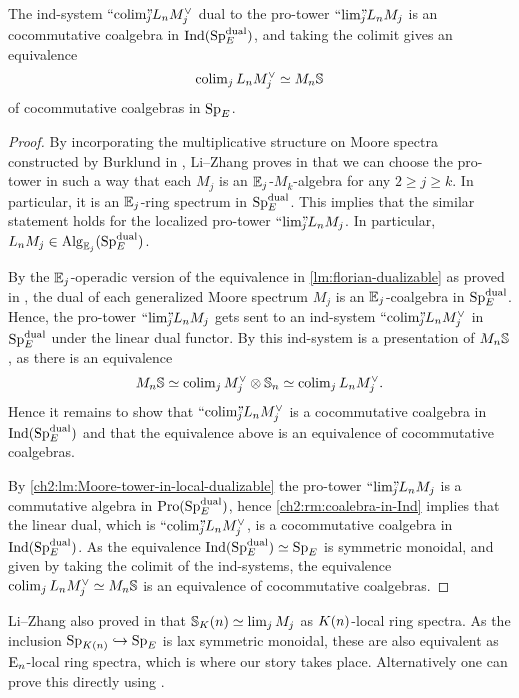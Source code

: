 \begin{lemma}
    \label{ch2:lm:coalgebra-ind-presentation-of-monochromatic-sphere}
    The ind-system $\indcolim L_n M_j^\vee$ dual to the pro-tower $\prolim L_n M_j$ is an cocommutative coalgebra in $\Ind(\SpE\dual)$, and taking the colimit gives an equivalence 
    \[\colim_j L_n M_j^\vee \simeq M_n\S\] 
    of cocommutative coalgebras in $\SpE$. 
\end{lemma}
\begin{proof}
    By incorporating the multiplicative structure on Moore spectra constructed by Burklund in \cite{burklund_2022}, Li--Zhang proves in \cite[2.1.4]{li-zhang_2023} that we can choose the pro-tower in such a way that each $M_j$ is an $\E_j$-$M_k$-algebra for any $2\geq j \geq k$. In particular, it is an $\E_j$-ring spectrum in $\SpE\dual$. This implies that the similar statement holds for the localized pro-tower $\prolim L_n M_j$. In particular, $L_n M_j \in \Alg_{\E_j}(\SpE\dual)$. 
    
    By the $\E_j$-operadic version of the equivalence in \cref{lm:florian-dualizable} as proved in \cite[2.21]{peroux_2022}, the dual of each generalized Moore spectrum $M_j$ is an $\E_j$-coalgebra in $\SpE\dual$. Hence, the pro-tower $\prolim L_n M_j$ gets sent to an ind-system $\indcolim L_n M_j^\vee$ in $\SpE\dual$ under the linear dual functor. By \cite[7.10(c)]{hovey-strickland_99} this ind-system is a presentation of $M_n\S$, as there is an equivalence 
    \[M_n \S \simeq \colim_j M_j^\vee \otimes \S_n \simeq \colim_j L_n M_j^\vee.\]
    Hence it remains to show that $\indcolim L_n M_j^\vee$ is a cocommutative coalgebra in $\Ind(\SpE\dual)$ and that the equivalence above is an equivalence of cocommutative coalgebras. 

    By \cref{ch2:lm:Moore-tower-in-local-dualizable} the pro-tower $\prolim L_n M_j$ is a commutative algebra in $\Pro(\SpE\dual)$, hence \cref{ch2:rm:coalebra-in-Ind} implies that the linear dual, which is $\indcolim L_n M_j^\vee$, is a cocommutative coalgebra in $\Ind(\SpE\dual)$. As the equivalence $\Ind(\SpE\dual)\simeq \SpE$ is symmetric monoidal, and given by taking the colimit of the ind-systems, the equivalence $\colim_j L_n M_j^\vee \simeq M_n \S$ is an equivalence of cocommutative coalgebras.  
\end{proof}

\begin{remark}
    Li--Zhang also proved in \cite[2.1.5]{li-zhang_2023} that $\S_\Kn \simeq \lim_j M_j$ as $\Kn$-local ring spectra. As the inclusion $\SpKn\hookrightarrow \SpE$ is lax symmetric monoidal, these are also equivalent as $\En$-local ring spectra, which is where our story takes place. Alternatively one can prove this directly using \cite[2.1.6]{li-zhang_2023}. 
\end{remark}

